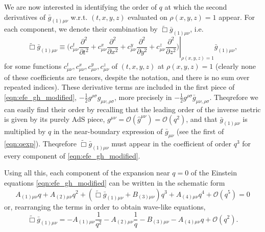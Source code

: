 \documentclass[a4paper,11pt]{article}
\numberwithin{equation}{section}
\begin{document}
We are now interested in identifying the order of $q$ at which the second derivatives of $ \bar{g}_{(1) \mu \nu}$ w.r.t. $(t,x,y,z)$ evaluated on $\rho(x,y,z)=1$ appear.
For each component, we denote their combination by $\tilde{\Box}\bar{g}_{(1)\mu\nu}$, i.e. 
\begin{equation}
\tilde{\Box}\bar{g}_{(1)\mu\nu}\equiv\left.\biggl(c^t_{\mu\nu}\frac{\partial^2}{\partial t^2}+c^x_{\mu\nu}\frac{\partial^2}{\partial x^2}+c^y_{\mu\nu}\frac{\partial^2}{\partial y^2}+c^z_{\mu\nu}\frac{\partial^2}{\partial z^2}\biggr)\right |_{\rho(x,y,z)=1}\bar{g}_{(1)\mu\nu},
\end{equation}
for some functions $c^t_{\mu\nu},c^x_{\mu\nu},c^y_{\mu\nu},c^z_{\mu\nu}$ of $(t,x,y,z)$ at $\rho(x,y,z)=1$ (clearly none of these coefficients are tensors, despite the notation, and there is no sum over repeated indices).
These derivative terms are included in the first piece of \eqref{eqn:efe_gh_modified}, $-\frac{1}{2}g^{\rho \sigma} g_{\mu \nu, \rho \sigma}$, more precisely in $-\frac{1}{2}g^{\rho \sigma} \bar{g}_{\mu \nu, \rho \sigma}$.
Theqrefore we can easily find their order by recalling that the leading order of the inverse metric is given by its purely AdS piece, $g^{\mu\nu}=\mathcal{O}(\hat{g}^{\mu\nu})=\mathcal{O}(q^{2})$, and that $\bar{g}_{(1)\mu\nu}$ is multiplied by $q$ in the near-boundary expression of $\bar{g}_{\mu\nu}$ (see the first of \eqref{eqn:qexp}). Theqrefore $\tilde{\Box}\bar{g}_{(1)\mu\nu}$ must appear in the coefficient of order $q^{3}$ for every component of \eqref{eqn:efe_gh_modified}.

Using all this, each component of the expansion near $q=0$ of the Einstein equations \eqref{eqn:efe_gh_modified} can be written in the schematic form
\begin{equation}\label{eq:efefullexp}
A_{(1)\mu\nu}q+A_{(2)\mu\nu}q^2+(\tilde{\Box}\bar{g}_{(1)\mu\nu}+B_{(3)\mu\nu})q^3+A_{(4)\mu\nu}q^4+\mathcal{O}(q^5)=0
\end{equation}
or, rearranging the terms in order to obtain wave-like equations,
\begin{equation}
\tilde{\Box}\bar{g}_{(1)\mu\nu}=-A_{(1)\mu\nu}\frac{1}{q^2}-A_{(2)\mu\nu}\frac{1}{q}-B_{(3)\mu\nu}-A_{(4)\mu\nu}q+\mathcal{O}(q^2).
\end{equation}
\end{document}
